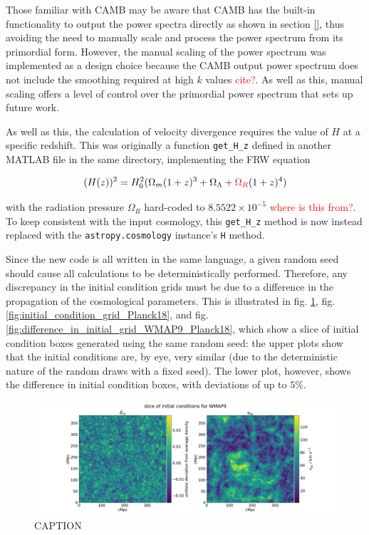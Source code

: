 \documentclass[floats,floatfix,showpacs,amssymb,prd,superscriptaddress,nofootinbib]{revtex4-2} %
\newcommand{\code}{\texttt}
\newcommand{\red}{\textcolor{red}}
\begin{document}
Those familiar with CAMB may be aware that CAMB has the built-in functionality to output the power spectra directly as shown in section \ref{}, thus avoiding the need to manually scale and process the power spectrum from its primordial form. However, the manual scaling of the power spectrum was implemented as a design choice because the CAMB output power spectrum does not include the smoothing required at high $k$ values \red{cite?}. As well as this, manual scaling offers a level of control over the primordial power spectrum that sets up future work.

As well as this, the calculation of velocity divergence requires the value of $H$ at a specific redshift. This was originally a function \code{get\_H\_z} defined in another MATLAB file in the same directory, implementing the FRW equation

\begin{equation}
    (H(z))^2 = H_0^2 (\Omega_m (1 + z)^3 + \Omega_\Lambda + \red{\Omega_R} (1+z)^4)
\end{equation}

\noindent with the radiation pressure $\Omega_R$ hard-coded to $8.5522 \times 10^{-5}$ \red{where is this from?}. To keep consistent with the input cosmology, this \code{get\_H\_z} method is now instead replaced with the \code{astropy.cosmology} instance's \code{H} method.

Since the new code is all written in the same language, a given random seed should cause all calculations to be deterministically performed. Therefore, any discrepancy in the initial condition grids must be due to a difference in the propagation of the cosmological parameters. This is illustrated in fig. \ref{fig:initial_condition_grid_WMAP9}, fig. \ref{fig:initial_condition_grid_Planck18}, and fig. \ref{fig:difference_in_initial_grid_WMAP9_Planck18}, which show a slice of initial condition boxes generated using the same random seed: the upper plots show that the initial conditions are, by eye, very similar (due to the deterministic nature of the random draws with a fixed seed). The lower plot, however, shows the difference in initial condition boxes, with deviations of up to $5 \%$.

\newpage
\begin{figure}[H]
    \centering
    \includegraphics[width=0.9\columnwidth]{images/ic_grids/initial_condition_grid_WMAP9.png}
    \caption{CAPTION}
    \label{fig:initial_condition_grid_WMAP9}
\end{figure}
\end{document}
